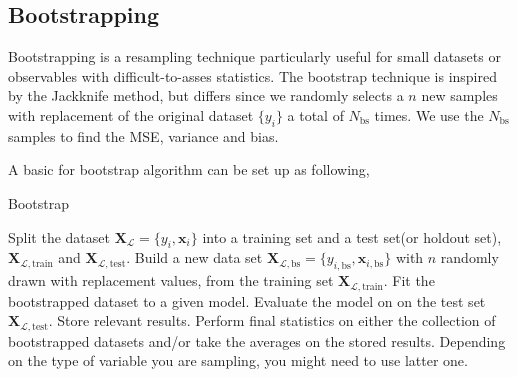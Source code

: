 \documentclass[11pt]{article}
\begin{document}
\subsection{Bootstrapping}
Bootstrapping is a resampling technique particularly useful for small datasets or observables with difficult-to-asses statistics\cite{efron1994introduction}. The bootstrap technique is inspired by the Jackknife method\cite{efron1981}, but differs since we randomly selects a $n$ new samples with replacement of the original dataset $\{y_i\}$ a total of $N_\mathrm{bs}$ times. We use the $N_\mathrm{bs}$ samples to find the MSE, variance and bias. 

A basic for bootstrap algorithm can be set up as following,
\begin{algorithm}[H]
    \caption{Bootstrap}
    \label{alg:bootstrap}
    \begin{algorithmic}[1]
        \State Split the dataset $\bm{X}_{\mathcal{L}}=\{y_i,\bm{x}_i\}$ into a training set and a test set(or holdout set), $\bm{X}_{\mathcal{L},\mathrm{train}}$ and $\bm{X}_{\mathcal{L},\mathrm{test}}$.
            \State Build a new data set $\bm{X}_{\mathcal{L},\mathrm{bs}}=\{y_{i,\mathrm{bs}},\bm{x}_{i,\mathrm{bs}}\}$ with $n$ randomly drawn with replacement values, from the training set $\bm{X}_{\mathcal{L},\mathrm{train}}$.
            \State Fit the bootstrapped dataset to a given model.
            \State Evaluate the model on on the test set $\bm{X}_{\mathcal{L},\mathrm{test}}$.
            \State Store relevant results.
        \EndFor
        \State Perform final statistics on either the collection of bootstrapped datasets and/or take the averages on the stored results. Depending on the type of variable you are sampling, you might need to use latter one.
    \end{algorithmic}
\end{algorithm}
\end{document}
